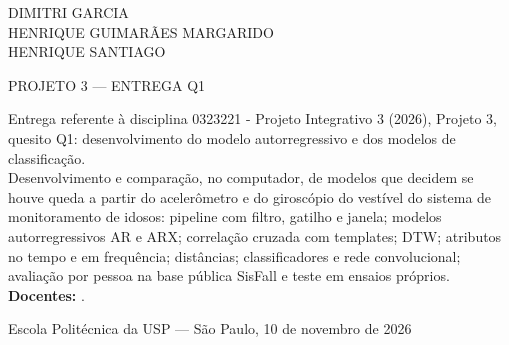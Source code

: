 \documentclass[12pt,a4paper]{article}
\newcommand{\docentes}{}
\begin{document}
	\begin{titlepage}
		\centering

		{\large DIMITRI GARCIA\\HENRIQUE GUIMAR\~AES MARGARIDO\\HENRIQUE SANTIAGO\\}

		\vspace{4cm}
		{\LARGE{PROJETO 3 --- ENTREGA Q1}} \\
		\vspace{2cm}
		\begin{flushright}
			\begin{minipage}{0.55\textwidth}
				Entrega referente à disciplina 0323221 - Projeto Integrativo 3 (2026),
				Projeto 3, quesito Q1: desenvolvimento do modelo autorregressivo e dos
				modelos de classificação. \\[0.5cm]
				Desenvolvimento e comparação, no computador, de modelos que decidem se
				houve queda a partir do acelerômetro e do giroscópio do vestível do
				sistema de monitoramento de idosos: pipeline com filtro, gatilho e
				janela; modelos autorregressivos AR e ARX; correlação cruzada com
				templates; DTW; atributos no tempo e em frequência; distâncias;
				classificadores e rede convolucional; avaliação por pessoa na base
				pública SisFall e teste em ensaios próprios.
				\ifx\docentes\empty\else\\[0.5cm]\textbf{Docentes:} \docentes.\fi
			\end{minipage}
		\end{flushright}

		\vfill
		{\small Escola Polit\'ecnica da USP --- S\~ao Paulo, 10 de novembro de 2026}
	\end{titlepage}

\end{document}
